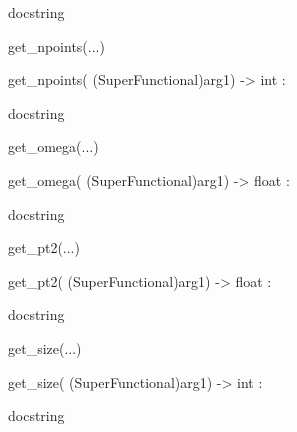 \documentclass[letterpaper,10pt,english]{sphinxmanual}
\begin{document}
\begin{description}
\begin{description}
\begin{DUlineblock}{0em}
\begin{DUlineblock}{\DUlineblockindent}
\begin{DUlineblock}{\DUlineblockindent}
\item[] docstring
\item[] 
\end{DUlineblock}
\end{DUlineblock}
\item[] get\_npoints(...)
\item[]
\begin{DUlineblock}{\DUlineblockindent}
\item[] get\_npoints( (SuperFunctional)arg1) -\textgreater{} int :
\item[]
\begin{DUlineblock}{\DUlineblockindent}
\item[] docstring
\item[] 
\end{DUlineblock}
\end{DUlineblock}
\item[] get\_omega(...)
\item[]
\begin{DUlineblock}{\DUlineblockindent}
\item[] get\_omega( (SuperFunctional)arg1) -\textgreater{} float :
\item[]
\begin{DUlineblock}{\DUlineblockindent}
\item[] docstring
\item[] 
\end{DUlineblock}
\end{DUlineblock}
\item[] get\_pt2(...)
\item[]
\begin{DUlineblock}{\DUlineblockindent}
\item[] get\_pt2( (SuperFunctional)arg1) -\textgreater{} float :
\item[]
\begin{DUlineblock}{\DUlineblockindent}
\item[] docstring
\item[] 
\end{DUlineblock}
\end{DUlineblock}
\item[] get\_size(...)
\item[]
\begin{DUlineblock}{\DUlineblockindent}
\item[] get\_size( (SuperFunctional)arg1) -\textgreater{} int :
\item[]
\begin{DUlineblock}{\DUlineblockindent}
\item[] docstring

\end{DUlineblock}
\end{DUlineblock}
\end{DUlineblock}
\end{description}
\end{description}
\end{document}
